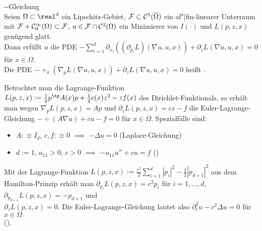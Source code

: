 \begin{Satz}{--Gleichung}\\
    Seien $\Omega \subset \real^d$ ein Lipschitz-Gebiet,
    $\mathcal{F} \subset \mathcal{C}^1(\overline{\Omega})$ ein af"|fin-linearer Unterraum mit
    $\mathcal{F} + \mathcal{C}_0^\infty(\Omega) \subset \mathcal{F}$,
    $u \in \mathcal{F} \cap \mathcal{C}^2(\Omega)$ ein Minimierer von $I(\cdot)$ und
    $L(p, z, x)$ genügend glatt.\\
    Dann erfüllt $u$ die PDE
    $-\sum_{i=1}^d \partial_{x_i} ((\partial_{p_i} L) (\nabla u, u, x)) +
    \partial_z L(\nabla u, u, x) = 0$
    für $x \in \Omega$.\\
    Die PDE $-\div_x(\nabla_p L(\nabla u, u, x)) + \partial_z L(\nabla u, u, x) = 0$ heißt .
\end{Satz}

\linie

\begin{Bsp}
    Betrachtet man die Lagrange-Funktion
    $L(p, z, x) := \frac{1}{2} p^\tp A(x) p + \frac{1}{2} c(x) z^2 - zf(x)$
    des Dirichlet-Funktionals, so erhält man wegen $\nabla_p L(p, z, x) = Ap$ und
    $\partial_z L(p, z, x) = cz - f$ die Euler-Lagrange-Gleichung
    $-\div(A\nabla u) + cu - f = 0$ für $x \in \Omega$.
    Spezialfälle sind:
    \begin{itemize}
        \item
        $A :\equiv I_d$, $c, f :\equiv 0$
        $\implies$ $-\Delta u = 0$ (Laplace-Gleichung)
        
        \item
        $d := 1$, $a_{11} > 0$, $c > 0$
        $\implies$ $-a_{11} u'' + cu = f$ ()
    \end{itemize}
\end{Bsp}

\linie

\begin{Bsp}
    Mit der Lagrange-Funktion
    $L(p, z, x) := \frac{c^2}{2} \sum_{i=1}^d |p_i|^2 - \frac{1}{2} |p_{d+1}|^2$ aus dem
    Hamilton-Prinzip erhält man $\partial_{p_i} L(p, z, x) = c^2 p_i$ für $i = 1, \dotsc, d$,
    $\partial_{p_{d+1}} L(p, z, x) = -p_{d+1}$ und\\
    $\partial_z L(p, z, x) = 0$.
    Die Euler-Lagrange-Gleichung lautet also
    $\partial_t^2 u - c^2 \Delta u = 0$ für $x \in \Omega$\\
    ().
\end{Bsp}

